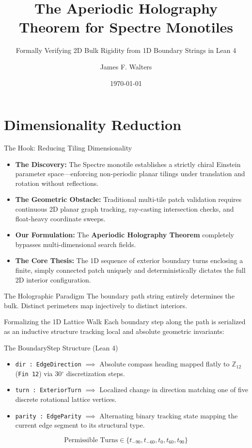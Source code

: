 \documentclass[10pt]{beamer}
\title[Aperiodic Holography]{The Aperiodic Holography Theorem for Spectre Monotiles}
\subtitle{Formally Verifying 2D Bulk Rigidity from 1D Boundary Strings in Lean 4}
\author[James F. Walters]{James F. Walters}
\institute[Port Townsend]{Port Townsend Recreational Math Club}
\date{\today}
\begin{document}
\frame{\titlepage}

\section{Dimensionality Reduction}

\begin{frame}{The Hook: Reducing Tiling Dimensionality}
\begin{itemize}
    \item \textbf{The Discovery:} The Spectre monotile establishes a strictly chiral Einstein parameter space—enforcing non-periodic planar tilings under translation and rotation without reflections.
    \item \textbf{The Geometric Obstacle:} Traditional multi-tile patch validation requires continuous 2D planar graph tracking, ray-casting intersection checks, and float-heavy coordinate sweeps.
    \item \textbf{Our Formulation:} The \textbf{Aperiodic Holography Theorem} completely bypasses multi-dimensional search fields.
    \item \textbf{The Core Thesis:} The 1D sequence of exterior boundary turns enclosing a finite, simply connected patch uniquely and deterministically dictates the full 2D interior configuration.
\end{itemize}
\begin{block}{The Holographic Paradigm}
The boundary path string entirely determines the bulk. Distinct perimeters map injectively to distinct interiors.
\end{block}
\end{frame}

\begin{frame}{Formalizing the 1D Lattice Walk}
Each boundary step along the path is serialized as an inductive structure tracking local and absolute geometric invariants:
\begin{block}{The BoundaryStep Structure (Lean 4)}
\begin{itemize}
    \item \texttt{dir : EdgeDirection} $\implies$ Absolute compass heading mapped flatly to $\mathbb{Z}_{12}$ (\texttt{Fin 12}) via 30$^\circ$ discretization steps.
    \item \texttt{turn : ExteriorTurn} $\implies$ Localized change in direction matching one of five discrete rotational lattice vertices.
    \item \texttt{parity : EdgeParity} $\implies$ Alternating binary tracking state mapping the current edge segment to its structural type.
\end{itemize}
\end{block}
\vfill
$$\text{Permissible Turns} \in \{t_{-90}, t_{-60}, t_{0}, t_{60}, t_{90}\}$$
\end{frame}
\end{document}
